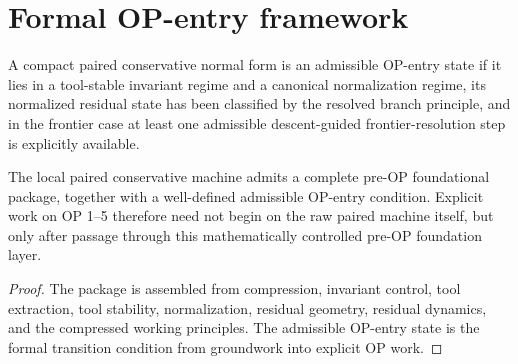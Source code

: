 \section{Formal OP-entry framework}
\begin{definition}\label{def:admissible-op-entry-state}
A compact paired conservative normal form is an admissible OP-entry state if it lies in a tool-stable invariant regime and a canonical normalization regime, its normalized residual state has been classified by the resolved branch principle, and in the frontier case at least one admissible descent-guided frontier-resolution step is explicitly available.
\end{definition}

\begin{theorem}\label{thm:pre-op-foundation-synthesis}
The local paired conservative machine admits a complete pre-OP foundational package, together with a well-defined admissible OP-entry condition. Explicit work on OP 1--5 therefore need not begin on the raw paired machine itself, but only after passage through this mathematically controlled pre-OP foundation layer.
\end{theorem}

\begin{proof}
The package is assembled from compression, invariant control, tool extraction, tool stability, normalization, residual geometry, residual dynamics, and the compressed working principles. The admissible OP-entry state is the formal transition condition from groundwork into explicit OP work.
\end{proof}

